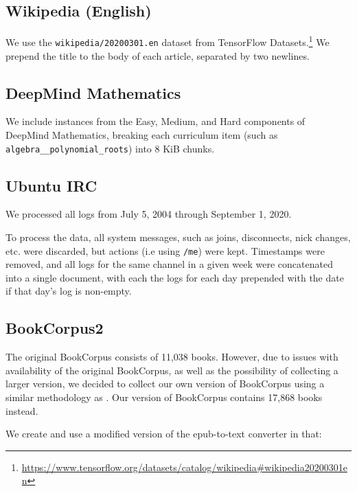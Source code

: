 \documentclass[11pt,a4paper]{article}
\begin{document}
\begin{appendices}
\subsection{Wikipedia (English)}

We use the \texttt{wikipedia/20200301.en} dataset from TensorFlow Datasets.\footnote{\url{https://www.tensorflow.org/datasets/catalog/wikipedia\#wikipedia20200301en}} We prepend the title to the body of each article, separated by two newlines. 

\subsection{DeepMind Mathematics}

We include instances from the Easy, Medium, and Hard components of DeepMind Mathematics, breaking each curriculum item (such as {\tt algebra\_\_polynomial\_roots}) into 8 KiB chunks.

\subsection{Ubuntu IRC}

We processed all logs from July 5, 2004 through September 1, 2020.

To process the data, all system messages, such as joins, disconnects, nick changes, etc. were discarded, but actions (i.e using {\tt /me}) were kept. Timestamps were removed, and all logs for the same channel in a given week were concatenated into a single document, with each the logs for each day prepended with the date if that day's log is non-empty.

\subsection{BookCorpus2}

The original BookCorpus consists of 11,038 books. However, due to issues with availability of the original BookCorpus, as well as the possibility of collecting a larger version, we decided to collect our own version of BookCorpus using a similar methodology as \citet{BookCorpusCode}. Our version of BookCorpus contains 17,868 books instead.

We create and use a modified version of the epub-to-text converter in \citet{BookCorpusCode} that:


\end{appendices}
\end{document}
